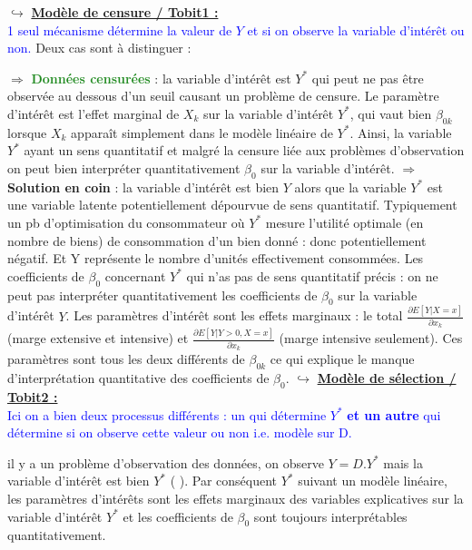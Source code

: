 \bigbreak
\noindent $\hookrightarrow$ \underline{\textbf{Modèle de censure / Tobit1 :}} \\
\textcolor{blue}{1 seul mécanisme détermine la valeur de $Y$ et si on observe la variable d'intérêt ou non. } Deux cas sont à distinguer :\par
\bigbreak
$\Rightarrow$ \textbf{\textcolor{ForestGreen}{Données censurées}} : la variable d'intérêt est $Y^{*}$ qui peut ne pas être observée au dessous d'un seuil causant un problème de censure. Le paramètre d'intérêt est l'effet marginal de $X_{k}$ sur la variable d'intérêt $Y^{*}$, qui vaut bien $\beta_{0k}$ lorsque $X_{k}$ apparaît simplement dans le modèle linéaire de $Y^{*}$. Ainsi, la variable $Y^{*}$ ayant un sens quantitatif et malgré la censure liée aux problèmes d'observation on peut bien interpréter quantitativement $\beta_{0}$ sur la variable d'intérêt.
\bigbreak
$\Rightarrow$ \textbf{\textcolor{BrickRed}{Solution en coin}} : la variable d'intérêt est bien $Y$ alors que la variable $Y^{*}$ est une variable latente potentiellement dépourvue de sens quantitatif. Typiquement un pb d'optimisation du consommateur où $Y^{*}$ mesure l'utilité optimale (en nombre de biens) de consommation d'un bien donné : donc potentiellement négatif. Et Y représente le nombre d'unités effectivement consommées. Les coefficients de $\beta_{0}$ concernant $Y^{*}$ qui n'as pas de sens quantitatif précis : on ne peut pas interpréter quantitativement les coefficients de $\beta_{0}$ sur la variable d'intérêt $Y$. Les paramètres d'intérêt sont les effets marginaux : le total $\frac{\partial E[Y|X=x]}{\partial x_{k}}$ (marge extensive et intensive) et $\frac{\partial E[Y|Y>0,X=x]}{\partial x_{k}}$ (marge intensive seulement). Ces paramètres sont tous les deux différents de $\beta_{0k}$ ce qui explique le manque d'interprétation quantitative des coefficients de $\beta_{0}$.
\bigbreak
\noindent $\hookrightarrow$ \underline{\textbf{Modèle de sélection / Tobit2 :}} \\
\textcolor{blue}{Ici on a bien deux processus différents : un qui détermine $Y^{*}$ \textbf{et un autre} qui détermine si on observe cette valeur ou non i.e. modèle sur D.}\par 
{} il y a un problème d'observation des données, on observe $Y=D.Y^{*}$ mais la variable d'intérêt est bien $Y^{*}$ ( ). Par conséquent $Y^{*}$ suivant un modèle linéaire, les paramètres d'intérêts sont les effets marginaux des variables explicatives sur la variable d'intérêt $Y^{*}$ et les coefficients de $\beta_{0}$ sont toujours interprétables quantitativement.

\newpage